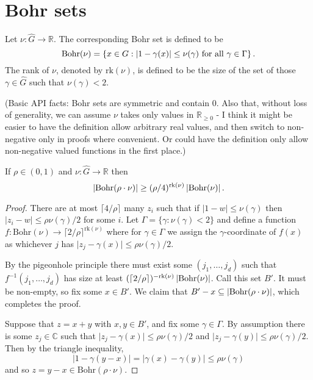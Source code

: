 \chapter{Bohr sets}

\begin{definition}
\label{bohr-set}
Let $\nu: \widehat{G} \to \mathbb{R}$. The corresponding Bohr set is defined to be
\[\mathrm{Bohr}(\nu)=\left\{ x\in G : \left\lvert 1-\gamma(x)\right\rvert\leq \nu(\gamma)\textrm{ for all }\gamma\in\Gamma\right\}.\]
The rank of $\nu$, denoted by $\mathrm{rk}(\nu)$, is defined to be the size of the set of those $\gamma\in\widehat{G}$ such that $\nu(\gamma)<2$.

(Basic API facts: Bohr sets are symmetric and contain $0$. Also that, without loss of generality, we can assume $\nu$ takes only values in $\mathbb{R}_{\geq 0}$ - I think it might be easier to have the definition allow arbitrary real values, and then switch to non-negative only in proofs where convenient. Or could have the definition only allow non-negative valued functions in the first place.)
\end{definition}

\begin{lemma}
\label{bohr-size}
If $\rho\in (0,1)$ and $\nu:\widehat{G}\to \mathbb{R}$ then
\[\left\lvert \mathrm{Bohr}(\rho\cdot \nu)\right\rvert\geq (\rho/4)^{\mathrm{rk}(\nu)}\left\lvert \mathrm{Bohr}(\nu)\right\rvert.\]
\end{lemma}
\begin{proof}
There are at most $\lceil 4/\rho\rceil$ many $z_i$ such that if $\lvert 1-w\rvert \leq \nu(\gamma)$ then $\lvert z_i-w\rvert\leq \rho\nu(\gamma)/2$ for some $i$. Let $\Gamma=\{ \gamma : \nu(\gamma) <2\}$ and define a function $f:\mathrm{Bohr}(\nu)\to \lceil 2/\rho\rceil^{\mathrm{rk}(\nu)}$ where for $\gamma\in \Gamma$ we assign the $\gamma$-coordinate of $f(x)$ as whichever $j$ has $\lvert z_j-\gamma(x)\rvert \leq \rho\nu(\gamma)/2$.

By the pigeonhole principle there must exist some $(j_1,\ldots,j_{d})$ such that $f^{-1}(j_1,\ldots,j_d)$ has size at least $(\lceil 2/\rho\rceil)^{-\mathrm{rk}(\nu)}\left\lvert \mathrm{Bohr}(\nu)\right\rvert$. Call this set $B'$. It must be non-empty, so fix some $x\in B'$. We claim that $B'-x\subseteq \left\lvert \mathrm{Bohr}(\rho\cdot \nu)\right\rvert$, which completes the proof.

Suppose that $z=x+y$ with $x,y\in B'$, and fix some $\gamma\in \Gamma$. By assumption there is some $z_j\in \mathbb{C}$ such that $\lvert z_j-\gamma(x)\rvert \leq \rho \nu(\gamma)/2$ and $\lvert z_j-\gamma(y)\rvert \leq \rho \nu(\gamma)/2$. Then by the triangle inequality,
\[\lvert 1-\gamma(y-x)\rvert=\lvert \gamma(x)-\gamma(y)\rvert \leq \rho \nu(\gamma)\]
and so $z=y-x\in \mathrm{Bohr}(\rho\cdot \nu)$.
\end{proof}

